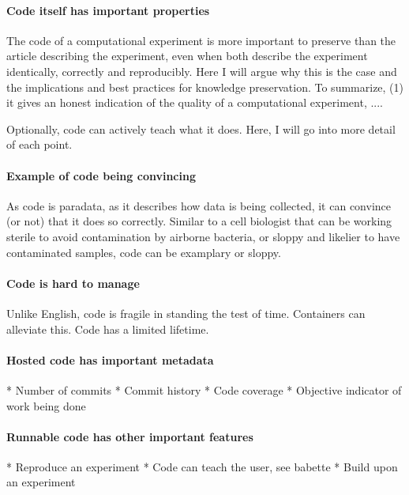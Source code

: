 \paragraph{Code itself has important properties}

The code of a computational experiment is
more important to preserve than the article describing
the experiment, even when both describe the experiment identically,
correctly and reproducibly. 
Here I will argue why this is the
case and the implications and best practices for knowledge preservation.
To summarize, (1) it gives an honest indication of the quality 
of a computational experiment, ....

Optionally, code can actively teach what it does.
Here, I will go into more detail of each point.

\paragraph{Example of code being convincing}

As code is paradata, as it describes how data is being collected,
it can convince (or not) that it does so correctly.
Similar to a cell biologist that can be working sterile to avoid contamination
by airborne bacteria, 
or sloppy and likelier to have contaminated samples,
code can be examplary or sloppy.

\paragraph{Code is hard to manage}

Unlike English, code is fragile in standing the test of time.
Containers can alleviate this.
Code has a limited lifetime.

\paragraph{Hosted code has important metadata}

 * Number of commits
 * Commit history
 * Code coverage
 * Objective indicator of work being done

\paragraph{Runnable code has other important features}

 * Reproduce an experiment
 * Code can teach the user, see babette
 * Build upon an experiment

